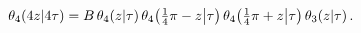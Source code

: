 \[\mathop{\theta_{4}\/}\nolimits\!\left(4z\middle|4\tau\right)=B\mathop{\theta_{%
4}\/}\nolimits\!\left(z\middle|\tau\right)\mathop{\theta_{4}\/}\nolimits\!%
\left(\tfrac{1}{4}\pi-z\middle|\tau\right)\*\mathop{\theta_{4}\/}\nolimits\!%
\left(\tfrac{1}{4}\pi+z\middle|\tau\right)\mathop{\theta_{3}\/}\nolimits\!%
\left(z\middle|\tau\right).\]